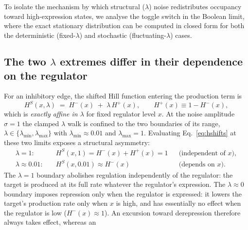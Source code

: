 \documentclass[11pt]{article}
\providecommand{\DIFaddtex}[1]{{\protect\color{red}#1}} %
\providecommand{\DIFdeltex}[1]{} %
\providecommand{\DIFaddbegin}{} %
\providecommand{\DIFaddend}{} %
\providecommand{\DIFdelbegin}{} %
\providecommand{\DIFdelend}{} %
\providecommand{\DIFadd}[1]{\texorpdfstring{\DIFaddtex{#1}}{#1}} %
\providecommand{\DIFdel}[1]{\texorpdfstring{\DIFdeltex{#1}}{}} %
\providecommand{\DIFaddincludegraphics}[2][]{\DIFOincludegraphics[#1]{#2}} %
\providecommand{\DIFdelincludegraphics}[2][]{}
\DeclareRobustCommand{\DIFaddbegin}{\DIFOaddbegin \let\includegraphics\DIFaddincludegraphics} %
\DeclareRobustCommand{\DIFaddend}{\DIFOaddend \let\includegraphics\DIFOincludegraphics} %
\DeclareRobustCommand{\DIFdelbegin}{\DIFOdelbegin \let\includegraphics\DIFdelincludegraphics} %
\DeclareRobustCommand{\DIFdelend}{\DIFOaddend \let\includegraphics\DIFOincludegraphics} %
\begin{document}
To isolate the mechanism by which structural ($\lambda$) noise redistributes
occupancy toward high-expression states, we analyse the toggle switch in the
Boolean limit, where the exact stationary distribution can be computed in closed
form for both the deterministic (fixed-$\lambda$) and stochastic (fluctuating-$\lambda$)
cases.

\subsection{The two $\lambda$ extremes \DIFdelbegin \DIFdel{are not symmetric}\DIFdelend \DIFaddbegin \DIFadd{differ in their dependence on the regulator}\DIFaddend }
\label{sec:asymmetry}

For an inhibitory edge, the shifted Hill function entering the production term is
\begin{equation}
  H^{S}(x,\lambda) \;=\; H^{-}(x) \;+\; \lambda\,H^{+}(x),
  \qquad H^{+}(x) \equiv 1 - H^{-}(x),
  \label{eq:hshifts}
\end{equation}
which is \emph{exactly affine in $\lambda$} for fixed regulator level $x$. At the
noise amplitude $\sigma=1$ the clamped $\lambda$ walk is confined to the two
boundaries of its range, $\lambda\in\{\lambda_{\min},\lambda_{\max}\}$ with
$\lambda_{\min}\approx 0.01$ and $\lambda_{\max}=1$. Evaluating
Eq.~\DIFdelbegin \DIFdel{\eqref{eq:hshift} }\DIFdelend \DIFaddbegin \DIFadd{\eqref{eq:hshifts} }\DIFaddend at these two limits exposes a structural asymmetry:
\begin{align}
  \lambda = 1: \quad & H^{S}(x,1) = H^{-}(x)+H^{+}(x) = 1
    && \text{(independent of } x\text{)},\\
  \lambda \approx 0.01: \quad & H^{S}(x,0.01) \approx H^{-}(x)
    && \text{(depends on } x\text{)}.
\end{align}
The $\lambda=1$ boundary abolishes regulation \DIFdelbegin \emph{\DIFdel{unconditionally}}%
\DIFdelend \DIFaddbegin \DIFadd{independently of the regulator}\DIFaddend :
the target is produced at its full rate \DIFdelbegin \DIFdel{regardless of }\DIFdelend \DIFaddbegin \DIFadd{whatever }\DIFaddend the regulator's expression. The
$\lambda\approx 0$ boundary imposes repression only \DIFdelbegin \emph{\DIFdel{conditionally}}%
\DIFdelend \DIFaddbegin \DIFadd{when the regulator is
expressed}\DIFaddend : it lowers the target's production rate only when \DIFdelbegin \DIFdel{the regulator }\DIFdelend $x$ is high, and has
essentially no effect when the regulator is low ($H^{-}(x)\!\approx\!1$).
An excursion toward \DIFdelbegin \DIFdel{de-repression therefore always ``fires, '' }\DIFdelend \DIFaddbegin \DIFadd{derepression therefore always takes effect, }\DIFaddend whereas an
\end{document}
